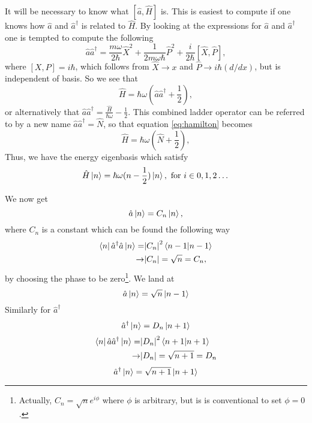 \documentclass{article}
\begin{document}
It will be necessary to know what $[\hat{a},\hat{H}]$ is. This is easiest to compute if one knows how $\hat{a}$ and $\hat{a}^{\dagger}$ is related to $\hat{H}$. By looking at the expressions for $\hat{a}$ and $\hat{a}^{\dagger}$ one is tempted to compute the following
\begin{equation*}
\hat{a}\hat{a}^{\dagger}=\frac{m\omega}{2\hbar}\hat{X}^2+\frac{1}{2m\omega\hbar}\hat{P}^2+\frac{i}{2\hbar}[\hat{X},\hat{P}],
\end{equation*}
where $[X,P]=i\hbar$, which follows from $\hat{X}\rightarrow x$ and $\hat{P}\rightarrow i\hbar (d/dx)$, but is independent of basis. So we see that
\begin{equation}
\label{eq:hamilton}
\hat{H} = \hbar\omega(\hat{a}\hat{a}^{\dagger}+\frac{1}{2}),
\end{equation}
or alternatively that $\hat{a}\hat{a}^{\dagger}=\frac{\hat{H}}{\hbar \omega}-\frac{1}{2}$.
This combined ladder operator can be referred to by a new name $\hat{a}\hat{a}^{\dagger}=\hat{N}$, so that equation \ref{eq:hamilton} becomes
\begin{equation}
\hat{H} = \hbar\omega(\hat{N}+\frac{1}{2}),
\end{equation}
Thus, we have the energy eigenbasis which satisfy
\begin{equation}
\hat{H}\ket{n}=\hbar\omega(n-\frac{1}{2})\ket{n}, \text{ for } i \in 0, 1, 2 \dots
\end{equation}

We now get
\begin{equation}
\hat{a}\ket{n} = C_n\ket{n},
\end{equation}
where $C_n$ is a constant which can be found the following way
\begin{align*}
\bra{n}\hat{a}^{\dagger}\hat{a}\ket{n} = & \abs{C_n}^2\braket{n-1}\\
\rightarrow & \abs{C_n}=\sqrt{n}=C_n,
\end{align*}
by choosing the phase to be zero\footnote{Actually, $C_n=\sqrt{n}e^{i\phi}$ where $\phi$ is arbitrary, but is is conventional to set $\phi=0$.}. We land at
\begin{equation}
\hat{a}\ket{n}=\sqrt{n}\ket{n-1}
\end{equation}
Similarly for $\hat{a}^{\dagger}$
\begin{equation}
\hat{a}^{\dagger}\ket{n} = D_n\ket{n+1}
\end{equation}
\begin{align*}
\bra{n}\hat{a}\hat{a}^{\dagger}\ket{n}=&\abs{D_n}^2\braket{n+1} \\
\rightarrow & \abs{D_n}=\sqrt{n+1}=D_n
\end{align*}
\begin{equation}
\hat{a}^{\dagger}\ket{n}=\sqrt{n+1}\ket{n+1}
\end{equation}
\end{document}
